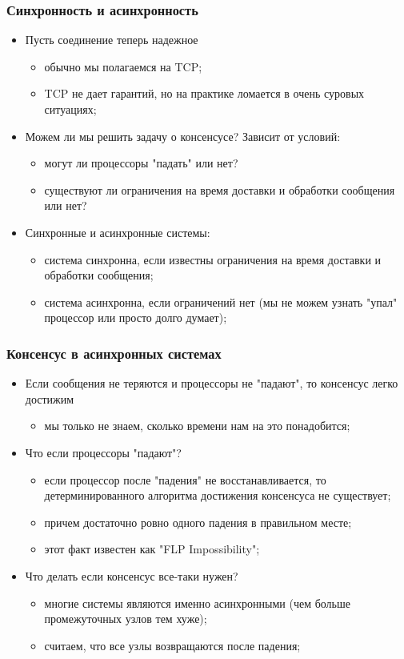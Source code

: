 \begin{frame}
\frametitle{Синхронность и асинхронность}
\begin{itemize}
  \item<1-> Пусть соединение теперь надежное
    \begin{itemize}
      \item обычно мы полагаемся на TCP;
      \item TCP не дает гарантий, но на практике ломается в очень суровых ситуациях;
    \end{itemize}
  \item<2-> Можем ли мы решить задачу о консенсусе? Зависит от условий:
    \begin{itemize}
      \item могут ли процессоры "падать" или нет?
      \item существуют ли ограничения на время доставки и обработки сообщения или нет?
    \end{itemize}
  \item<3-> Синхронные и асинхронные системы:
    \begin{itemize}
      \item система синхронна, если известны ограничения на время доставки и обработки сообщения;
      \item система асинхронна, если ограничений нет (мы не можем узнать "упал" процессор или просто долго думает);
    \end{itemize}
\end{itemize}
\end{frame}

\begin{frame}
\frametitle{Консенсус в асинхронных системах}
\begin{itemize}
  \item<1-> Если сообщения не теряются и процессоры не "падают", то консенсус легко достижим
    \begin{itemize}
      \item мы только не знаем, сколько времени нам на это понадобится;
    \end{itemize}
  \item<2-> Что если процессоры "падают"?
    \begin{itemize}
      \item если процессор после "падения" не восстанавливается, то детерминированного алгоритма достижения консенсуса не существует;
      \item причем достаточно ровно одного падения в правильном месте;
      \item этот факт известен как "FLP Impossibility";
    \end{itemize}
  \item<3-> Что делать если консенсус все-таки нужен?
    \begin{itemize}
      \item многие системы являются именно асинхронными (чем больше промежуточных узлов тем хуже);
      \item считаем, что все узлы возвращаются после падения;
    \end{itemize}
\end{itemize}
\end{frame}
